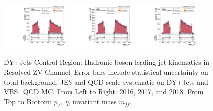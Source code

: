 \begin{figure}[!ht]
  \includegraphics[width=0.30\textwidth]{analysis_plots/2016_zjj/cr_vjets_l/dijet_m.pdf}
  \includegraphics[width=0.30\textwidth]{analysis_plots/2017_zjj/cr_vjets_l/dijet_m.pdf}
  \includegraphics[width=0.30\textwidth]{analysis_plots/2018_zjj/cr_vjets_l/dijet_m.pdf} \\
  \caption[DY+Jets Control Region: Hadronic boson leading jet kinematics in Resolved ZV Channel]%
  {DY+Jets Control Region: Hadronic boson leading jet kinematics in Resolved ZV Channel.
    Error bars include statistical uncertainty on total background,
    JES and QCD scale systematic on DY+Jets and VBS\_QCD MC\@. From Left to Right: 2016,
    2017, and 2018. From Top to Bottom: \( p_T \), \( \eta \), invariant mass \( m_{jj} \).}%
  \label{fig:zjj-cr-vjets-l-dijet1-pt-eta-m}
\end{figure}

